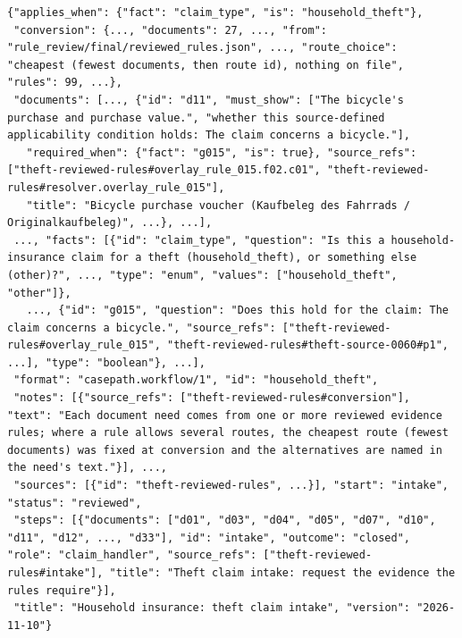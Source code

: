 \begin{lstlisting}[title={\textbf{Theft workflow} (\texttt{household\_theft.json}, excerpt)}]
{"applies_when": {"fact": "claim_type", "is": "household_theft"},
 "conversion": {..., "documents": 27, ..., "from": "rule_review/final/reviewed_rules.json", ..., "route_choice": "cheapest (fewest documents, then route id), nothing on file", "rules": 99, ...},
 "documents": [..., {"id": "d11", "must_show": ["The bicycle's purchase and purchase value.", "whether this source-defined applicability condition holds: The claim concerns a bicycle."],
   "required_when": {"fact": "g015", "is": true}, "source_refs": ["theft-reviewed-rules#overlay_rule_015.f02.c01", "theft-reviewed-rules#resolver.overlay_rule_015"],
   "title": "Bicycle purchase voucher (Kaufbeleg des Fahrrads / Originalkaufbeleg)", ...}, ...],
 ..., "facts": [{"id": "claim_type", "question": "Is this a household-insurance claim for a theft (household_theft), or something else (other)?", ..., "type": "enum", "values": ["household_theft", "other"]},
   ..., {"id": "g015", "question": "Does this hold for the claim: The claim concerns a bicycle.", "source_refs": ["theft-reviewed-rules#overlay_rule_015", "theft-reviewed-rules#theft-source-0060#p1", ...], "type": "boolean"}, ...],
 "format": "casepath.workflow/1", "id": "household_theft",
 "notes": [{"source_refs": ["theft-reviewed-rules#conversion"], "text": "Each document need comes from one or more reviewed evidence rules; where a rule allows several routes, the cheapest route (fewest documents) was fixed at conversion and the alternatives are named in the need's text."}], ...,
 "sources": [{"id": "theft-reviewed-rules", ...}], "start": "intake", "status": "reviewed",
 "steps": [{"documents": ["d01", "d03", "d04", "d05", "d07", "d10", "d11", "d12", ..., "d33"], "id": "intake", "outcome": "closed", "role": "claim_handler", "source_refs": ["theft-reviewed-rules#intake"], "title": "Theft claim intake: request the evidence the rules require"}],
 "title": "Household insurance: theft claim intake", "version": "2026-11-10"}
\end{lstlisting}
